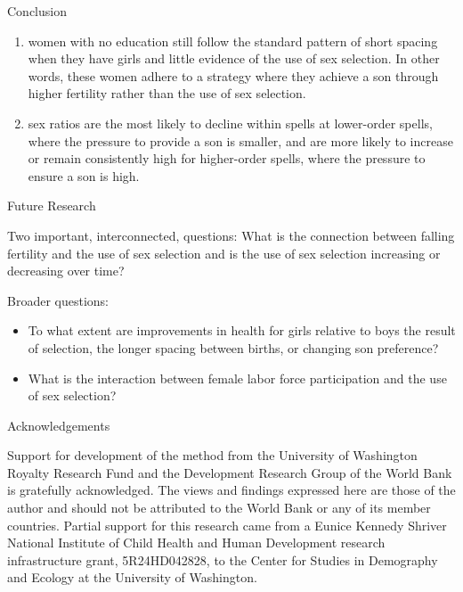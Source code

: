 \documentclass[final]{beamer}
\newlength{\onecolwid}
\begin{document}
\begin{frame}{}
\begin{columns}[t]
\begin{column}{\onecolwid}
\begin{block}{Conclusion}
\begin{enumerate}
\item women with no education still follow the standard pattern of
short spacing when they have girls and little evidence of the use of sex
selection.
In other words, these women adhere to a strategy where they achieve a
son through higher fertility rather than the use of sex selection.

\item sex ratios are the most likely to decline within spells at
lower-order spells, where the pressure to provide a son is smaller, and
are more likely to increase or remain consistently high for higher-order
spells, where the pressure to ensure a son is high.

\end{enumerate}
 


\end{block}

\begin{block}{Future Research}

Two important, interconnected, questions:
What is the connection between falling fertility and the 
use of sex selection and is the use of sex selection increasing 
or decreasing over time?

\bigskip

Broader questions:
\begin{itemize}
\item To what extent are improvements in health for girls
relative to boys the result of selection, the longer spacing between
births, or changing son preference?
\item What is the interaction between female labor force participation
and the use of sex selection?
\end{itemize}

\end{block}

\begin{block}{Acknowledgements}

Support for development of the method from the University of Washington Royalty 
Research Fund and the Development Research Group of the World Bank is gratefully 
acknowledged.
The views and findings expressed here are those of the author and
should not be attributed to the World Bank or any of its member countries.
Partial support for this research came from a Eunice Kennedy Shriver National
Institute of Child Health and Human Development research infrastructure grant,
5R24HD042828, to the Center for Studies in Demography and Ecology at the
University of Washington.

\end{block}



\end{column}


\end{columns}

\end{frame}
\end{document}
